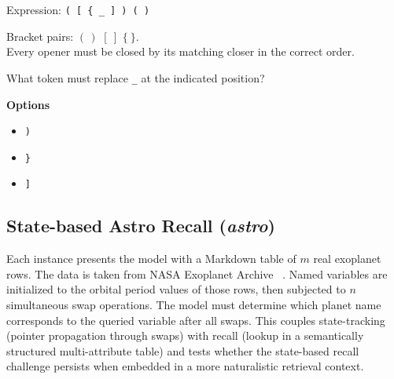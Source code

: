 \documentclass[11pt]{article}
\theoremstyle{definition}
\begin{document}
\begin{tcolorbox}[colback=gray!5!white, colframe=gray!75!black, title=Example Prompt, breakable]
\small
Expression: \texttt{( [ \{ \_ ] ) ( )}

Bracket pairs: \((\,)\) \quad \([\ ]\) \quad \(\{\ \}\). \\
Every opener must be closed by its matching closer in the correct order.

What token must replace \texttt{\_} at the indicated position?

\textbf{Options}
\begin{itemize}
  \item[A)] \texttt{)}
  \item[B)] \texttt{\}}
  \item[C)] \texttt{]}
\end{itemize}
\end{tcolorbox}

\subsection{State-based Astro Recall (\textit{astro})}

Each instance presents the model with a Markdown table of $m$ real exoplanet rows. The data is taken from NASA Exoplanet Archive ~\cite{christiansen2025nasa}. Named variables are initialized to the orbital period values of those rows, then subjected to $n$ simultaneous swap operations. The model must determine which planet name corresponds to the queried variable after all swaps. This couples state-tracking (pointer propagation through swaps) with recall (lookup in a semantically structured multi-attribute table) and tests whether the state-based recall challenge persists when embedded in a more naturalistic retrieval context.
\end{document}
